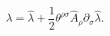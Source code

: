 \begin{equation}
\lambda =\hat \lambda +\frac{1}{2}\theta^{\rho\sigma}\hat A_{\rho}\partial_{\sigma}\hat \lambda .
\label{swm}
\end{equation}

